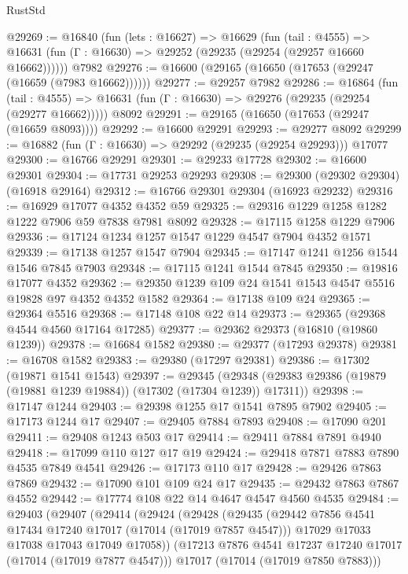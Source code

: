 \begin{lexlean}{RustStd}
\begin{coremodule}
{\begin{coremodule}
{{{{{{{{{{{{{{{{{{{{{{{{{{{{{{{{{{{{{{{{{{{{{{{{{{{{{{{@29269 := @16840
    (fun (lets : @16627) =>
    @16629
      (fun (tail : @4555) =>
      @16631 (fun (Γ : @16630) => @29252 (@29235 (@29254 (@29257 @16660 @16662))))))
    @7982
@29276 := @16600 (@29165 (@16650 (@17653 (@29247 (@16659 (@7983 @16662))))))
@29277 := @29257 @7982
@29286 := @16864
    (fun (tail : @4555) => @16631 (fun (Γ : @16630) => @29276 (@29235 (@29254 (@29277 @16662)))))
    @8092
@29291 := @29165 (@16650 (@17653 (@29247 (@16659 @8093))))
@29292 := @16600 @29291
@29293 := @29277 @8092
@29299 := @16882 (fun (Γ : @16630) => @29292 (@29235 (@29254 @29293))) @17077
@29300 := @16766 @29291
@29301 := @29233 @17728
@29302 := @16600 @29301
@29304 := @17731 @29253 @29293
@29308 := @29300 (@29302 @29304) (@16918 @29164)
@29312 := @16766 @29301 @29304 (@16923 @29232)
@29316 := @16929 @17077 @4352 @4352 @59
@29325 := @29316 @1229 @1258 @1282 @1222 @7906 @59 @7838 @7981 @8092
@29328 := @17115 @1258 @1229 @7906
@29336 := @17124 @1234 @1257 @1547 @1229 @4547 @7904 @4352 @1571
@29339 := @17138 @1257 @1547 @7904
@29345 := @17147 @1241 @1256 @1544 @1546 @7845 @7903
@29348 := @17115 @1241 @1544 @7845
@29350 := @19816 @17077 @4352
@29362 := @29350 @1239 @109 @24 @1541 @1543 @4547 @5516 @19828 @97 @4352 @4352 @1582
@29364 := @17138 @109 @24
@29365 := @29364 @5516
@29368 := @17148 @108 @22 @14
@29373 := @29365 (@29368 @4544 @4560 @17164 @17285)
@29377 := @29362 @29373 (@16810 (@19860 @1239))
@29378 := @16684 @1582
@29380 := @29377 (@17293 @29378)
@29381 := @16708 @1582
@29383 := @29380 (@17297 @29381)
@29386 := @17302 (@19871 @1541 @1543)
@29397 := @29345
    (@29348 (@29383 @29386 (@19879 (@19881 @1239 @19884)) (@17302 (@17304 @1239)) @17311))
@29398 := @17147 @1244
@29403 := @29398 @1255 @17 @1541 @7895 @7902
@29405 := @17173 @1244 @17
@29407 := @29405 @7884 @7893
@29408 := @17090 @201
@29411 := @29408 @1243 @503 @17
@29414 := @29411 @7884 @7891 @4940
@29418 := @17099 @110 @127 @17 @19
@29424 := @29418 @7871 @7883 @7890 @4535 @7849 @4541
@29426 := @17173 @110 @17
@29428 := @29426 @7863 @7869
@29432 := @17090 @101 @109 @24 @17
@29435 := @29432 @7863 @7867 @4552
@29442 := @17774 @108 @22 @14 @4647 @4547 @4560 @4535
@29484 := @29403
    (@29407
      (@29414
        (@29424
          (@29428
            (@29435
              (@29442 @7856 @4541 @17434 @17240 @17017 (@17014 (@17019 @7857 @4547)))
              @17029
              @17033
              @17038
              @17043
              @17049
              @17058))
          (@17213 @7876 @4541 @17237 @17240 @17017 (@17014 (@17019 @7877 @4547)))
          @17017
          (@17014 (@17019 @7850 @7883)))
}}}}}}}}}}}}}}}}}}}}}}}}}}}}}}}}}}}}}}}}}}}}}}}}}}}}}}}
\end{coremodule}}
\end{coremodule}
\end{lexlean}
